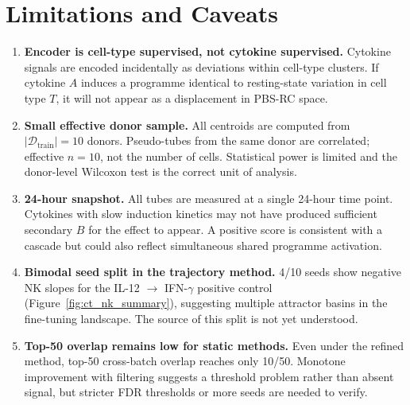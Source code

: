 \documentclass[11pt]{article}
\begin{document}
\section{Limitations and Caveats}

\begin{enumerate}[noitemsep]
  \item \textbf{Encoder is cell-type supervised, not cytokine supervised.} Cytokine
        signals are encoded incidentally as deviations within cell-type clusters. If
        cytokine $A$ induces a programme identical to resting-state variation in cell
        type $T$, it will not appear as a displacement in PBS-RC space.

  \item \textbf{Small effective donor sample.} All centroids are computed from
        $|\mathcal{D}_\mathrm{train}|=10$ donors. Pseudo-tubes from the same donor are
        correlated; effective $n=10$, not the number of cells. Statistical power is limited
        and the donor-level Wilcoxon test is the correct unit of analysis.

  \item \textbf{24-hour snapshot.} All tubes are measured at a single 24-hour time point.
        Cytokines with slow induction kinetics may not have produced sufficient secondary
        $B$ for the effect to appear. A positive score is consistent with a cascade but
        could also reflect simultaneous shared programme activation.

  \item \textbf{Bimodal seed split in the trajectory method.} 4/10 seeds show negative
        NK slopes for the IL-12 $\to$ IFN-$\gamma$ positive control
        (Figure~\ref{fig:ct_nk_summary}), suggesting multiple attractor basins in the
        fine-tuning landscape. The source of this split is not yet understood.

  \item \textbf{Top-50 overlap remains low for static methods.} Even under the refined
        method, top-50 cross-batch overlap reaches only 10/50. Monotone improvement
        with filtering suggests a threshold problem rather than absent signal, but
        stricter FDR thresholds or more seeds are needed to verify.
\end{enumerate}

\end{document}
